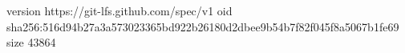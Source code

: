 version https://git-lfs.github.com/spec/v1
oid sha256:516d94b27a3a573023365bd922b26180d2dbee9b54b7f82f045f8a5067b1fe69
size 43864
